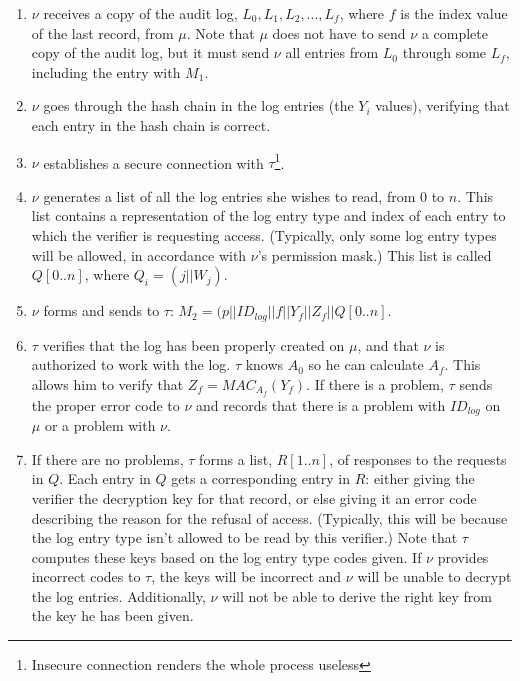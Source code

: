 \documentclass[12pt, letter]{article}
\begin{document}
\begin{enumerate}
    \item  $\nu$ receives a copy of the audit log, $L_0, L_1, L_2,...,L_f$, where $f$ is the index value of the last record, from $\mu$. Note that $\mu$ does not have to send $\nu$ a complete copy of the audit log, but it must send $\nu$ all entries from $L_0$ through some $L_f$, including the entry with $M_1$.
    
    \item $\nu$ goes through the hash chain in the log entries (the $Y_i$ values), verifying that each entry in the hash chain is correct.
    
    \item $\nu$ establishes a secure connection with $\tau$\footnote{Insecure connection renders the whole process useless}.

    \item $\nu$ generates a list of all the log entries she wishes to read, from $0$ to $n$. This list contains a representation of the log entry type and index of each entry to which the verifier is requesting access. (Typically, only some log entry types will be allowed, in accordance with $\nu$'s permission mask.) This list is called $Q[0..n]$, where $Q_i = (j||W_j)$.
    
    \item $\nu$ forms and sends to $\tau$: $M_2 = (p||ID_{log}||f||Y_f||Z_f||Q[0..n]$.
    
    \item $\tau$ verifies that the log has been properly created on $\mu$, and that $\nu$ is authorized to work with the log. $\tau$ knows $A_0$ so he can calculate $A_f$. This allows him to verify that $Z_f = MAC_{A_f}(Y_f)$. If there is a problem, $\tau$ sends the proper error code to $\nu$ and records that there is a problem with $ID_{log}$ on $\mu$ or a problem with $\nu$.

    \item If there are no problems, $\tau$ forms a list, $R[1..n]$, of responses to the requests in $Q$. Each entry in $Q$ gets a corresponding entry in $R$: either giving the verifier the decryption key for that record, or else giving it an error code describing the reason for the refusal of access. (Typically, this will be because the log entry type isn’t allowed to be read by this verifier.) Note that $\tau$ computes these keys based on the log entry type codes given. If $\nu$ provides incorrect codes to $\tau$, the keys will be incorrect and $\nu$ will be unable to decrypt the log entries. Additionally, $\nu$ will not be able to derive the right key from the key he has been given.


\end{enumerate}
\end{document}
